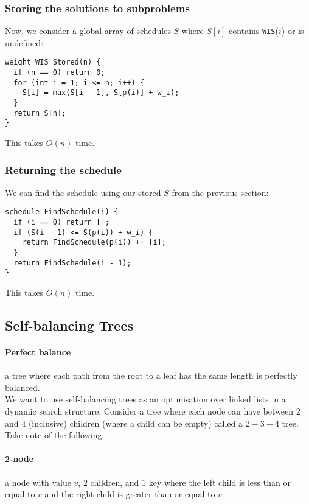 \documentclass[a4paper, 12pt, twoside]{article}
\begin{document}
\subsubsection{Storing the solutions to subproblems}

Now, we consider a global array of schedules $S$ where
$S[i]$ contains \texttt{WIS}($i$) or is undefined: \begin{lstlisting}
weight WIS_Stored(n) {
  if (n == 0) return 0;
  for (int i = 1; i <= n; i++) {
    S[i] = max(S[i - 1], S[p(i)] + w_i);
  }
  return S[n];
}
\end{lstlisting} This takes $O(n)$ time.

\newpage

\subsubsection{Returning the schedule}

We can find the schedule using our
stored $S$ from the previous section: \begin{lstlisting}
schedule FindSchedule(i) {
  if (i == 0) return [];
  if (S(i - 1) <= S(p(i)) + w_i) {
    return FindSchedule(p(i)) ++ [i]; 
  }
  return FindSchedule(i - 1);
}
\end{lstlisting} This takes $O(n)$ time.

\subsection{Self-balancing Trees}

\paragraph{Perfect balance} a tree where each path from the root to a leaf has the
same length is perfectly balanced.
\\[\baselineskip]
We want to use self-balancing trees as an optimisation over linked lists in a
dynamic search structure.
Consider a tree where each node can have between $2$ and $4$ (inclusive) children 
(where a child can be empty) called a $2-3-4$ tree. Take note of the following: 

  \paragraph{2-node} a node with value $v$, $2$ children, and $1$ key
  where the left child is less than or equal to $v$ and 
  the right child is greater than or equal to $v$.
\end{document}
